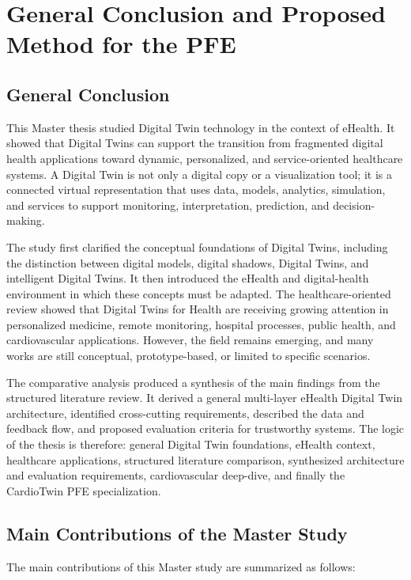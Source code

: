 \chapter{General Conclusion and Proposed Method for the PFE}

\section{General Conclusion}
This Master thesis studied Digital Twin technology in the context of eHealth. It showed that Digital Twins can support the transition from fragmented digital health applications toward dynamic, personalized, and service-oriented healthcare systems. A Digital Twin is not only a digital copy or a visualization tool; it is a connected virtual representation that uses data, models, analytics, simulation, and services to support monitoring, interpretation, prediction, and decision-making.

The study first clarified the conceptual foundations of Digital Twins, including the distinction between digital models, digital shadows, Digital Twins, and intelligent Digital Twins. It then introduced the eHealth and digital-health environment in which these concepts must be adapted. The healthcare-oriented review showed that Digital Twins for Health are receiving growing attention in personalized medicine, remote monitoring, hospital processes, public health, and cardiovascular applications. However, the field remains emerging, and many works are still conceptual, prototype-based, or limited to specific scenarios.

The comparative analysis produced a synthesis of the main findings from the structured literature review. It derived a general multi-layer eHealth Digital Twin architecture, identified cross-cutting requirements, described the data and feedback flow, and proposed evaluation criteria for trustworthy systems. The logic of the thesis is therefore: general Digital Twin foundations, eHealth context, healthcare applications, structured literature comparison, synthesized architecture and evaluation requirements, cardiovascular deep-dive, and finally the CardioTwin PFE specialization.

\section{Main Contributions of the Master Study}
The main contributions of this Master study are summarized as follows:

